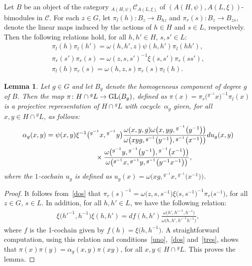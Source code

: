 \documentclass[pdftex]{sigma}
\numberwithin{equation}{section}
\newtheorem{Lemma}[Theorem]{Lemma}
 { \theoremstyle{definition}
\newtheorem{Example}[Theorem]{Example}
\newtheorem{Remark}[Theorem]{Remark} }
\newcommand{\C}{{\mathcal C}}
\newcommand{\1}{\textbf{1}}
\begin{document}
Let $B$ be an object of the category $_{A(H, \psi)}\C_{A(L, \xi)}$ of $(A(H, \psi), A(L, \xi))$-bimodules in $\C$. For each $z\in G$, let $\pi_l(h)\colon B_z \to B_{hz}$ and $\pi_r(s)\colon B_z \to B_{zs}$, denote the linear maps induced by the actions of $h \in H$ and $s \in L$, respectively. Then the following relations hold, for all $h, h' \in H$, $s, s' \in L$:
\begin{gather}\label{uno}\pi_l(h)\pi_l(h') = \omega(h, h', z) \psi(h, h') \pi_l(hh'), \\
\label{dos}\pi_r(s')\pi_r(s) = \omega(z, s, s')^{-1} \xi(s, s') \pi_r(ss'),\\
\label{tres}\pi_l(h)\pi_r(s) = \omega(h, z, s) \pi_r(s)\pi_l(h).\end{gather}

\begin{Lemma}\label{alfa-g} Let $g \in G$ and let $B_g$ denote the homogeneous component of degree $g$ of $B$. Then the map $\pi\colon H \cap {}^gL \to \text{\rm GL}(B_g)$, defined as $\pi(x) = \pi_r\big({}^{g^{-1}}x\big)^{-1}\pi_l(x)$ is a projective representation of $H \cap {}^gL$ with cocycle~$\alpha_g$ given, for all $x, y \in H \cap {}^gL$, as follows:
\begin{gather*}
\alpha_g(x, y) = \psi(x, y) \xi^{-1}\big({}^{g^{-1}}x, {}^{g^{-1}}y\big) \frac{\omega(x, y, g) \omega\big(x, yg, {}^{g^{-1}}\big(y^{-1}\big)\big)}
{\omega\big(xyg, {}^{g^{-1}}\big(y^{-1}\big),{} ^{g^{-1}}\big(x^{-1}\big)\big)} du_g(x, y) \\
\hphantom{\alpha_g(x, y) =}{} \times \frac{\omega\big({}^{g^{-1} } y, {}^{g^{-1}}\big(y^{-1}\big), {}^{g^{-1}}\big(x^{-1}\big)\big)} {\omega\big({}^{g^{-1}}x, {} ^{g^{-1}}y, {} ^{g^{-1}}\big(y^{-1}x^{-1}\big)\big)},
\end{gather*}
 where the $1$-cochain $u_g$ is defined as $u_g(x) = \omega\big(xg, {} ^{g^{-1}} x, {}^{g^{-1}} \big(x^{-1}\big)\big)$. \end{Lemma}

\begin{proof} It follows from~\eqref{dos} that $\pi_r(s)^{-1} = \omega\big(z, s, s^{-1}\big) \xi\big(s, s^{-1}\big)^{-1} \pi_r\big(s^{-1}\big)$, for all $z\in G$, $s \in L$. In addition, for all $h, h' \in L$, we have the following relation:
\begin{gather*}\xi \big({h'}^{-1}, h^{-1}\big) \xi (h, h') = df(h, h')\frac{\omega\big(h', {h'}^{-1}, h^{-1}\big)}
	{\omega\big(h, h', {h'}^{-1}h^{-1}\big)},\end{gather*}
where $f$ is the 1-cochain given by $f(h) = \xi\big(h, h^{-1}\big)$. A straightforward computation, using this relation and conditions~\eqref{uno},~\eqref{dos} and~\eqref{tres}, shows that $\pi(x) \pi(y) = \alpha_g(x, y) \pi(xy)$, for all $x, y \in H \cap {}^gL$. This proves the lemma. \end{proof}
\end{document}
